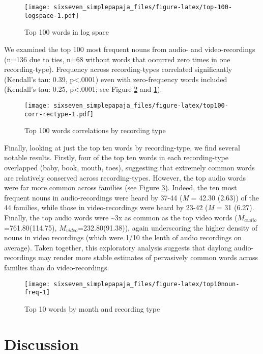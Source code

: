 \documentclass[floatsintext,man]{apa6}
\theoremstyle{definition}
\theoremstyle{definition}
\theoremstyle{definition}
\theoremstyle{remark}
\begin{document}
\begin{figure}
\centering
\texttt{[image: sixseven\_simplepapaja\_files/figure-latex/top-100-logspace-1.pdf]}
\caption{\label{fig:top-100-logspace}Top 100 words in log space}
\end{figure}

We examined the top 100 most frequent nouns from audio- and
video-recordings (n=136 due to ties, n=68 without words that occurred
zero times in one recording-type). Frequency across recording-types
correlated significantly (Kendall's tau: 0.39, p\textless{}.0001) even
with zero-frequency words included (Kendall's tau: 0.25,
p\textless{}.0001; see Figure \ref{fig:top100-corr-rectype} and
\ref{fig:top-100-logspace}).

\begin{figure}
\centering
\texttt{[image: sixseven\_simplepapaja\_files/figure-latex/top100-corr-rectype-1.pdf]}
\caption{\label{fig:top100-corr-rectype}Top 100 words correlations by
recording type}
\end{figure}

Finally, looking at just the top ten words by recording-type, we find
several notable results. Firstly, four of the top ten words in each
recording-type overlapped (baby, book, mouth, toes), suggesting that
extremely common words are relatively conserved across recording-types.
However, the top audio words were far more common across families (see
Figure \ref{fig:top10noun-freq}). Indeed, the ten most frequent nouns in
audio-recordings were heard by 37-44 (\emph{M} = 42.30 (2.63)) of the 44
families, while those in video-recordings were heard by 23-42 (\emph{M}
= 31 (6.27). Finally, the top audio words were \textasciitilde{}3x as
common as the top video words (\(M_{audio}\)=761.80(114.75),
\(M_{video}\)=232.80(91.38)), again underscoring the higher density of
nouns in video recordings (which were 1/10 the lenth of audio recordings
on average). Taken together, this exploratory analysis suggests that
daylong audio-recordings may render more stable estimates of pervasively
common words across families than do video-recordings.

\begin{figure}
\texttt{[image: sixseven\_simplepapaja\_files/figure-latex/top10noun-freq-1]} \caption{Top 10 words by month and recording type}\label{fig:top10noun-freq}
\end{figure}

\section{Discussion}\label{discussion}
\end{document}

